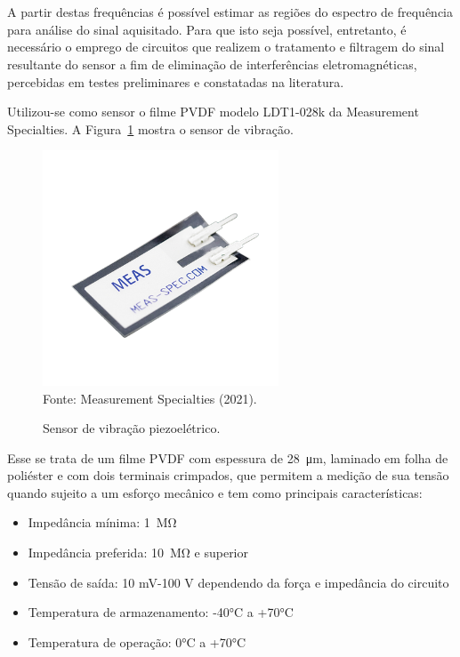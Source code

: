 \documentclass[
	12pt,				
	oneside,			
	a4paper,			
	english,			
	brazil,	
	sumario=abnt-6027-2012		
	]{abntex2ppgsi}
\begin{document}
\section{}
\label{secao:CircuitosCondicionnadores}

A partir destas frequências é possível estimar as regiões do espectro de frequência para análise do sinal aquisitado. Para que isto seja possível, entretanto, é necessário o emprego de circuitos que realizem o tratamento e filtragem do sinal resultante do sensor a fim de eliminação de interferências eletromagnéticas, percebidas em testes preliminares e constatadas na literatura.  

Utilizou-se como sensor o filme PVDF modelo LDT1-028k da Measurement Specialties. A Figura~\ref{Figura21} mostra o sensor de vibração. 

\begin{figure}[H]
\centering
\caption {Sensor de vibração piezoelétrico.}
\includegraphics[width=\textwidth,height=70mm,keepaspectratio]{Figura21} 
\label{Figura21} \\
Fonte: Measurement Specialties (2021).
\end{figure} 

Esse se trata de um filme PVDF com espessura de \SI{28}{\micro\meter}, laminado em folha de poliéster e com dois terminais crimpados, que permitem a medição de sua tensão quando sujeito a um esforço mecânico e tem como principais características: 

\begin{itemize}
	\item Impedância mínima: \SI{1}{\mega\ohm}
	\item Impedância preferida: \SI{10}{\mega\ohm} e superior
	\item Tensão de saída: 10 mV-100 V dependendo da força e impedância do circuito
	\item Temperatura de armazenamento: -40°C a +70°C 
	\item Temperatura de operação: 0°C a +70°C
\end{itemize}
\end{document}
